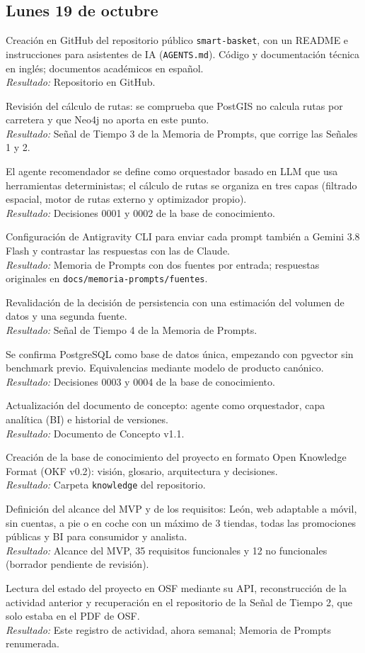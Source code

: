 \documentclass[11pt,a4paper]{article}
\newcommand{\actividad}[3]{\item[\textbf{[#1]}] #2 \\ \textit{Resultado:} #3}
\begin{document}
	\subsection*{Lunes 19 de octubre}
	\begin{description}[leftmargin=0pt, itemsep=6pt]
		\actividad{Tarea}{Creación en GitHub del repositorio público \texttt{smart-basket}, con un README e instrucciones para asistentes de IA (\texttt{AGENTS.md}). Código y documentación técnica en inglés; documentos académicos en español.}{Repositorio en GitHub.}
		\actividad{Investigación}{Revisión del cálculo de rutas: se comprueba que PostGIS no calcula rutas por carretera y que Neo4j no aporta en este punto.}{Señal de Tiempo 3 de la Memoria de Prompts, que corrige las Señales 1 y 2.}
		\actividad{Decisión}{El agente recomendador se define como orquestador basado en LLM que usa herramientas deterministas; el cálculo de rutas se organiza en tres capas (filtrado espacial, motor de rutas externo y optimizador propio).}{Decisiones 0001 y 0002 de la base de conocimiento.}
		\actividad{Tarea}{Configuración de Antigravity CLI para enviar cada prompt también a Gemini 3.8 Flash y contrastar las respuestas con las de Claude.}{Memoria de Prompts con dos fuentes por entrada; respuestas originales en \texttt{docs/memoria-prompts/fuentes}.}
		\actividad{Investigación}{Revalidación de la decisión de persistencia con una estimación del volumen de datos y una segunda fuente.}{Señal de Tiempo 4 de la Memoria de Prompts.}
		\actividad{Decisión}{Se confirma PostgreSQL como base de datos única, empezando con pgvector sin benchmark previo. Equivalencias mediante modelo de producto canónico.}{Decisiones 0003 y 0004 de la base de conocimiento.}
		\actividad{Documentación}{Actualización del documento de concepto: agente como orquestador, capa analítica (BI) e historial de versiones.}{Documento de Concepto v1.1.}
		\actividad{Documentación}{Creación de la base de conocimiento del proyecto en formato Open Knowledge Format (OKF v0.2): visión, glosario, arquitectura y decisiones.}{Carpeta \texttt{knowledge} del repositorio.}
		\actividad{Análisis}{Definición del alcance del MVP y de los requisitos: León, web adaptable a móvil, sin cuentas, a pie o en coche con un máximo de 3 tiendas, todas las promociones públicas y BI para consumidor y analista.}{Alcance del MVP, 35 requisitos funcionales y 12 no funcionales (borrador pendiente de revisión).}
		\actividad{Tarea}{Lectura del estado del proyecto en OSF mediante su API, reconstrucción de la actividad anterior y recuperación en el repositorio de la Señal de Tiempo 2, que solo estaba en el PDF de OSF.}{Este registro de actividad, ahora semanal; Memoria de Prompts renumerada.}

\end{description}
\end{document}
